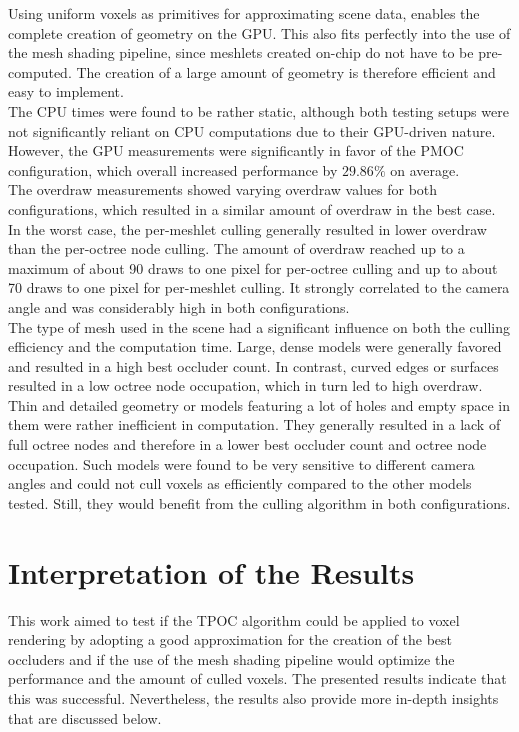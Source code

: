 \noindent
Using uniform voxels as primitives for approximating scene data, enables the complete creation of geometry on the 
\ac{GPU}. This also fits perfectly into the use of the mesh shading pipeline, since meshlets created on-chip do 
not have to be pre-computed. The creation of a large amount of geometry is therefore efficient and easy to 
implement. \\

\noindent
The \ac{CPU} times were found to be rather static, although both testing setups were not significantly reliant 
on \ac{CPU} computations due to their \ac{GPU}-driven nature. However, the \ac{GPU} measurements were significantly 
in favor of the \ac{PMOC} configuration, which overall increased performance by $29.86\%$ on 
average. \\

\noindent
The overdraw measurements showed varying overdraw values for both configurations, which resulted in a similar amount 
of overdraw in the best case. In the worst case, the per-meshlet culling generally resulted in lower overdraw than 
the per-octree node culling. The amount of overdraw reached up to a maximum of about 90 draws to one pixel for 
per-octree culling and up to about 70 draws to one pixel for per-meshlet culling. It strongly correlated to the 
camera angle and was considerably high in both configurations. \\ 

\noindent
The type of mesh used in the scene had a significant influence on both the culling efficiency and the computation time.
Large, dense models were generally favored and resulted in a high best occluder count. In contrast, curved edges or 
surfaces resulted in a low octree node occupation, which in turn led to high overdraw. Thin and detailed geometry or 
models featuring a lot of holes and empty space in them were rather inefficient in computation. They generally resulted 
in a lack of full octree nodes and therefore in a lower best occluder count and octree node occupation. Such models 
were found to be very sensitive to different camera angles and could not cull voxels as efficiently compared to the 
other models tested. Still, they would benefit from the culling algorithm in both configurations.

\section{Interpretation of the Results}

This work aimed to test if the \ac{TPOC} algorithm could be applied to voxel rendering by adopting a good approximation 
for the creation of the best occluders and if the use of the mesh shading pipeline would optimize the performance and 
the amount of culled voxels. The presented results indicate that this was successful. Nevertheless, the results also 
provide more in-depth insights that are discussed below. \\

